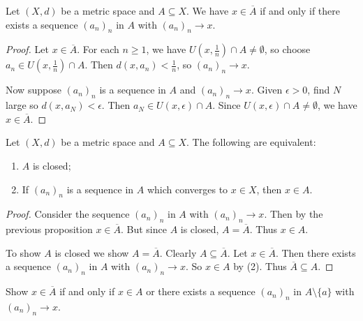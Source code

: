     \begin{proposition}\label{prop:1}
        Let $(X,d)$ be a metric space and $A \subseteq X$. We have $x \in \overline{A}$ if and only if there exists a sequence $(a_n)_n$ in $A$ with $(a_n)_n \rightarrow x$.
    \end{proposition}
        \begin{proof}
            Let $x \in \overline{A}$. For each $n \geq 1$, we have $U(x,\frac{1}{n}) \cap A \neq \emptyset$, so choose $a_n \in U(x,\frac{1}{n}) \cap A$. Then $d(x,a_n) < \frac{1}{n}$, so $(a_n)_n \rightarrow x$.

            Now suppose $(a_n)_n$ is a sequence in $A$ and $(a_n)_n \rightarrow x$. Given $\epsilon > 0$, find $N$ large so $d(x,a_N) < \epsilon$. Then $a_N \in U(x,\epsilon) \cap A$. Since $U(x,\epsilon) \cap A \neq \emptyset$, we have $x \in \overline{A}$. 
        \end{proof}

    \begin{proposition}\label{prop:closed-iff-seq}
        Let $(X,d)$ be a metric space and $A \subseteq X$. The following are equivalent:
            \begin{enumerate}[label = (\arabic*),itemsep=1pt,topsep=3pt]
                \item $A$ is closed;
                \item If $(a_n)_n$ is a sequence in $A$ which converges to $x \in X$, then $x \in A$.
            \end{enumerate}
    \end{proposition}
        \begin{proof}
            Consider the sequence $(a_n)_n$ in $A$ with $(a_n)_n \rightarrow x$. Then by the previous proposition $x \in \overline{A}$. But since $A$ is closed, $A = \overline{A}$. Thus $x \in A$.

            To show $A$ is closed we show $A = \overline{A}$. Clearly $A \subseteq \overline{A}$. Let $x \in \overline{A}$. Then there exists a sequence $(a_n)_n$ in $A$ with $(a_n)_n \rightarrow x$. So $x \in A$ by (2). Thus $\overline{A} \subseteq A$.
        \end{proof}

    \begin{exercise}
        Show $x \in \overline{A}$ if and only if $x \in A$ or there exists a sequence $(a_n)_n$ in $A \setminus\{a\}$ with $(a_n)_n \rightarrow x$.
    \end{exercise}

